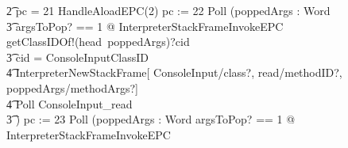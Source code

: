 \begin{figure}[tp!]
{\begin{circus}
    \t2 {} \circelse pc = 21 \circthen HandleAloadEPC(2) \circseq pc := 22 \circseq Poll \circseq (\circvar poppedArgs : \seq Word \circspot \\
    \t3 \lschexpract \exists argsToPop?  == 1 @ InterpreterStackFrameInvokeEPC \rschexpract \circseq getClassIDOf!(head~poppedArgs)?cid \then {} \\
    \t3 \circif cid = ConsoleInputClassID \circthen {} \\
    \t4 \lschexpract InterpreterNewStackFrame[ ConsoleInput/class?, read/methodID?, poppedArgs/methodArgs?] \rschexpract \circseq \\
    \t4 Poll \circseq ConsoleInput\_read \\
    \t3 \circfi) \circseq pc := 23 \circseq Poll \circseq (\circvar poppedArgs : \seq Word \circspot \lschexpract \exists argsToPop? == 1 @ InterpreterStackFrameInvokeEPC \rschexpract \circseq \\

\end{circus}}
\end{figure}
